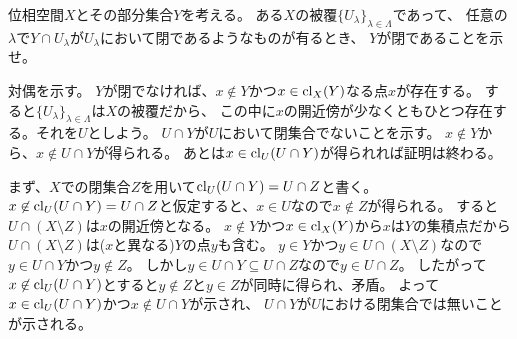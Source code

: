 \documentclass{jarticle}
\begin{document}
    \begin{Prop}
        位相空間$X$とその部分集合$Y$を考える。
        ある$X$の被覆$\{ U_{\lambda} \}_{\lambda \in \Lambda}$であって、
        任意の$\lambda$で$Y \cap U_{\lambda}$が$U_{\lambda}$において閉であるようなものが有るとき、
        $Y$が閉であることを示せ。
    \end{Prop}

    対偶を示す。
    $Y$が閉でなければ、$x \not \in Y$かつ$x \in \operatorname{cl}_{X}(Y)$なる点$x$が存在する。
    すると$\{ U_{\lambda} \}_{\lambda \in \Lambda}$は$X$の被覆だから、
    この中に$x$の開近傍が少なくともひとつ存在する。それを$U$としよう。
    $U \cap Y$が$U$において閉集合でないことを示す。
    $x \not \in Y$から、$x \not \in U \cap Y$が得られる。
    あとは$x \in \operatorname{cl}_{U}(U \cap Y)$が得られれば証明は終わる。

    まず、$X$での閉集合$Z$を用いて$\operatorname{cl}_{U}(U \cap Y)=U \cap Z$と書く。
    $x \not \in \operatorname{cl}_{U}(U \cap Y)=U \cap Z$と仮定すると、$x \in U$なので$x \not \in Z$が得られる。
    すると$U \cap (X \setminus Z)$は$x$の開近傍となる。
    $x \not \in Y$かつ$x \in \operatorname{cl}_{X}(Y)$から$x$は$Y$の集積点だから$U \cap (X \setminus Z)$は($x$と異なる)$Y$の点$y$も含む。
    $y \in Y$かつ$y \in U \cap (X \setminus Z)$なので$y \in U \cap Y$かつ$y \not \in Z$。
    しかし$y \in U \cap Y \subseteq U \cap Z$なので$y \in U \cap Z$。
    したがって$x \not \in \operatorname{cl}_{U}(U \cap Y)$とすると$y \not \in Z$と$y \in Z$が同時に得られ、矛盾。
    よって$x \in \operatorname{cl}_{U}(U \cap Y)$かつ$x \not \in U \cap Y$が示され、
    $U \cap Y$が$U$における閉集合では無いことが示される。
\end{document}
